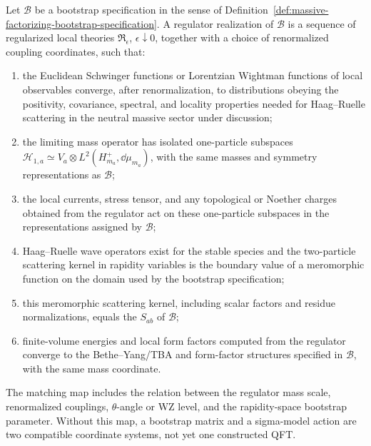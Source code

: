 \begin{definition}
\label{def:regulator-realization-bootstrap-specification}
Let \(\mathcal B\) be a bootstrap specification in the sense of
Definition~\ref{def:massive-factorizing-bootstrap-specification}.  A regulator
realization of \(\mathcal B\) is a sequence of regularized local theories
\(\mathfrak R_\epsilon\), \(\epsilon\downarrow0\), together with a choice of
renormalized coupling coordinates, such that:
\begin{enumerate}
  \item the Euclidean Schwinger functions or Lorentzian Wightman functions of
  local observables converge, after renormalization, to distributions obeying
  the positivity, covariance, spectral, and locality properties needed for
  Haag--Ruelle scattering in the neutral massive sector under discussion;
  \item the limiting mass operator has isolated one-particle subspaces
  \(\mathcal H_{1,a}\simeq V_a\otimes L^2(H_{m_a}^+,\dd\mu_{m_a})\), with
  the same masses and symmetry representations as \(\mathcal B\);
  \item the local currents, stress tensor, and any topological or Noether
  charges obtained from the regulator act on these one-particle subspaces in
  the representations assigned by \(\mathcal B\);
  \item Haag--Ruelle wave operators exist for the stable species and the
  two-particle scattering kernel in rapidity variables is the boundary value
  of a meromorphic function on the domain used by the bootstrap specification;
  \item this meromorphic scattering kernel, including scalar factors and
  residue normalizations, equals the \(S_{ab}\) of \(\mathcal B\);
  \item finite-volume energies and local form factors computed from the
  regulator converge to the Bethe--Yang/TBA and form-factor structures specified in
  \(\mathcal B\), with the same mass coordinate.
\end{enumerate}
The matching map includes the relation between the regulator mass scale,
renormalized couplings, \(\theta\)-angle or WZ level, and the rapidity-space
bootstrap parameter.  Without this map, a bootstrap matrix and a sigma-model
action are two compatible coordinate systems, not yet one constructed QFT.
\end{definition}

